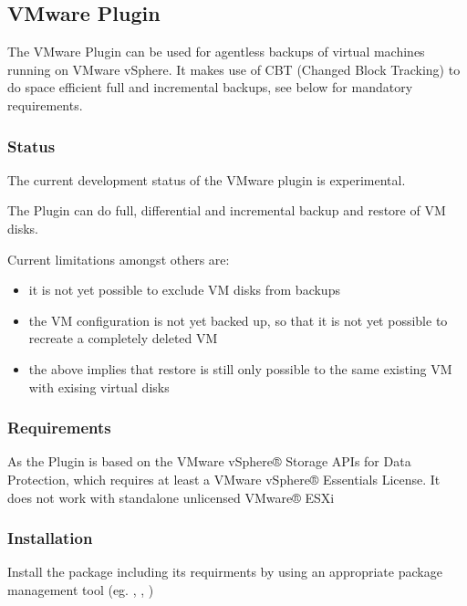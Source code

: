 \subsection{VMware Plugin}
\label{VMwarePlugin}

The VMware\raisebox{.6ex}{\textsuperscript{\textregistered}} Plugin can be
used for agentless backups of virtual machines running on
VMware vSphere\raisebox{.6ex}{\textsuperscript{\textregistered}}.
It makes use of CBT (Changed Block Tracking) to do space efficient
full and incremental backups, see below for mandatory requirements.

\subsubsection{Status}

The current development status of the VMware\raisebox{.6ex}{\textsuperscript{\textregistered}}
plugin is experimental.

The Plugin can do full, differential and incremental backup and restore of VM disks.

Current limitations amongst others are:
\begin{itemize}
\item it is not yet possible to exclude VM disks from backups
\item the VM configuration is not yet backed up, so that it is not yet
  possible to recreate a completely deleted VM
\item the above implies that restore is still only possible to the same existing
  VM with exising virtual disks
\end{itemize}

\subsubsection{Requirements}
As the Plugin is based on the VMware vSphere® Storage APIs for Data Protection,
which requires at least a VMware vSphere® Essentials License.
It does not work with standalone unlicensed
VMware® ESXi\raisebox{.6ex}{\textsuperscript{\texttrademark}}

\subsubsection{Installation}

Install the package  including its requirments
by using an appropriate package management tool
(eg. , , )

